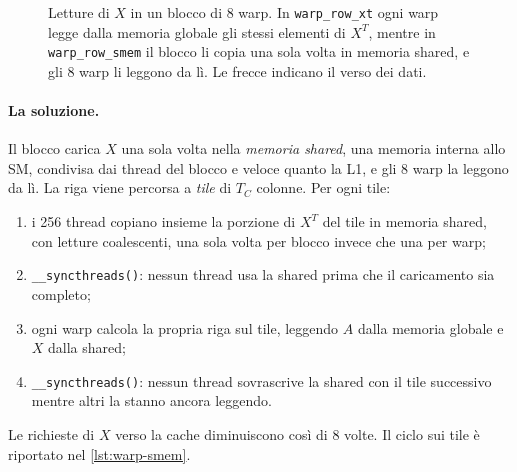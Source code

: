 \documentclass[11pt,a4paper]{article}
\begin{document}
\begin{figure}[H]
  \caption{Letture di $X$ in un blocco di 8 warp. In \texttt{warp\_row\_xt}
    ogni warp legge dalla memoria globale gli stessi elementi di $X^T$, mentre in \texttt{warp\_row\_smem} il blocco li copia una sola volta in memoria
    shared, e gli 8 warp li leggono da lì. Le frecce indicano il verso dei
    dati.}\label{fig:smem}
\end{figure}

\paragraph{La soluzione.} Il blocco carica $X$ una sola volta nella
\emph{memoria shared}, una memoria interna allo SM, condivisa dai thread del
blocco e veloce quanto la L1, e gli 8 warp la leggono da lì. La riga viene
percorsa a \emph{tile} di $T_C$ colonne. Per ogni tile:
\begin{enumerate}
  \item i 256 thread copiano insieme la porzione di $X^T$ del tile in memoria
        shared, con letture coalescenti, una sola volta per blocco invece che
        una per warp;
  \item \texttt{\_\_syncthreads()}: nessun thread usa la shared prima che il
        caricamento sia completo;
  \item ogni warp calcola la propria riga sul tile, leggendo $A$ dalla memoria
        globale e $X$ dalla shared;
  \item \texttt{\_\_syncthreads()}: nessun thread sovrascrive la shared con il
        tile successivo mentre altri la stanno ancora leggendo.
\end{enumerate}
Le richieste di $X$ verso la cache diminuiscono così di 8 volte.
Il ciclo sui tile è riportato nel \cref{lst:warp-smem}.
\end{document}

